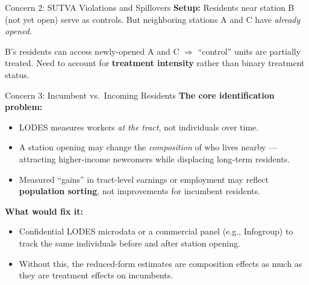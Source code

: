 \begin{frame}[label=concern2]{Concern 2: SUTVA Violations and Spillovers}
\small
\textbf{Setup:} Residents near station B (not yet open) serve as controls.
But neighboring stations A and C have \textit{already opened}.

\medskip
\begin{center}
\end{center}

\medskip
B's residents can access newly-opened A and C $\Rightarrow$
``control'' units are partially treated.
Need to account for \textbf{treatment intensity} rather than binary treatment status.
\end{frame}
\begin{frame}[label=concern3]{Concern 3: Incumbent vs.\ Incoming Residents}
\small
\textbf{The core identification problem:}
\begin{itemize}
  \item LODES measures workers \textit{at the tract}, not individuals over time.
  \item A station opening may change the \textit{composition} of who lives nearby ---
        attracting higher-income newcomers while displacing long-term residents.
  \item Measured ``gains'' in tract-level earnings or employment may reflect
        \textbf{population sorting}, not improvements for incumbent residents.
\end{itemize}
\bigskip
\textbf{What would fix it:}
\begin{itemize}
  \item Confidential LODES microdata or a commercial panel (e.g., Infogroup)
        to track the same individuals before and after station opening.
  \item Without this, the reduced-form estimates are composition effects as much
        as they are treatment effects on incumbents.
\end{itemize}
\end{frame}

